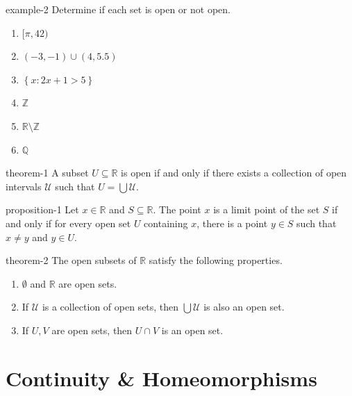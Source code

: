 \documentclass[10pt,]{article}
\newcommand{\mb}{\mathbb}
\newcommand{\mc}{\mathcal}
\newcommand{\setBuilder}[2]{\left\{#1:#2\right\}}
\begin{document}
\begin{example}{}{example-2}%
\hypertarget{p-23}{}%
Determine if each set is open or not open.%
\leavevmode%
\begin{enumerate}
\item\hypertarget{li-8}{}\([\pi,42)\)%
\item\hypertarget{li-9}{}\((-3,-1)\cup(4,5.5)\)%
\item\hypertarget{li-10}{}\(\setBuilder{x}{2x+1>5}\)%
\item\hypertarget{li-11}{}\(\mb Z\)%
\item\hypertarget{li-12}{}\(\mb R\setminus\mb Z\)%
\item\hypertarget{li-13}{}\(\mb Q\)%
\end{enumerate}
\end{example}
\begin{theorem}{}{}{theorem-1}%
\hypertarget{p-24}{}%
A subset \(U\subseteq\mb R\) is open if and only if there exists a collection of open intervals \(\mc U\) such that \(U=\bigcup\mc U\).%
\end{theorem}
\begin{proposition}{}{}{proposition-1}%
\hypertarget{p-25}{}%
Let \(x\in\mb R\) and \(S\subseteq\mb R\). The point \(x\) is a limit point of the set \(S\) if and only if for every open set \(U\) containing \(x\), there is a point \(y\in S\) such that \(x\not=y\) and \(y\in U\).%
\end{proposition}
\begin{theorem}{}{}{theorem-2}%
\hypertarget{p-26}{}%
The open subsets of \(\mb R\) satisfy the following properties.%
\leavevmode%
\begin{enumerate}
\item\hypertarget{li-14}{}\(\emptyset\) and \(\mb R\) are open sets.%
\item\hypertarget{li-15}{}If \(\mc U\) is a collection of open sets, then \(\bigcup\mc U\) is also an open set.%
\item\hypertarget{li-16}{}If \(U,V\) are open sets, then \(U\cap V\) is an open set.%
\end{enumerate}
\end{theorem}
%
%
\typeout{************************************************}
\typeout{************************************************}
%
\section[{Continuity \& Homeomorphisms}]{Continuity \& Homeomorphisms}\label{section-continuity}
%
%
\typeout{************************************************}
\typeout{************************************************}
%
\end{document}
